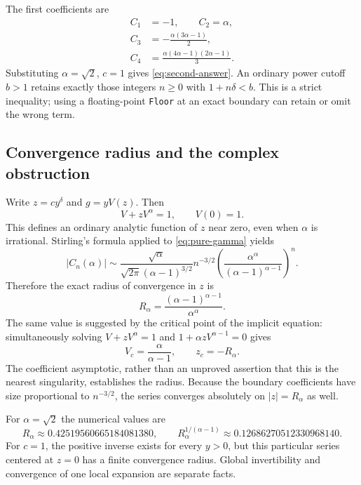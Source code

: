 \documentclass[11pt,a4paper]{article}
\numberwithin{equation}{section}
\theoremstyle{definition}\newtheorem{definition}[theorem]{Definition}
\theoremstyle{remark}\newtheorem{remark}[theorem]{Remark}
\newcommand{\code}[1]{\texttt{#1}}
\begin{document}
The first coefficients are
\begin{align*}
 C_1&=-1,\qquad C_2=\alpha,\\
 C_3&=-\frac{\alpha(3\alpha-1)}2,\\
 C_4&=\frac{\alpha(4\alpha-1)(2\alpha-1)}3.
\end{align*}
Substituting $\alpha=\sqrt2$, $c=1$ gives \cref{eq:second-answer}. An
ordinary power cutoff $b>1$ retains exactly those integers $n\ge0$ with
$1+n\delta<b$. This is a strict inequality; using a floating-point
\code{Floor} at an exact boundary can retain or omit the wrong term.

\subsection{Convergence radius and the complex obstruction}

Write $z=c y^\delta$ and $g=yV(z)$. Then
\begin{equation}
 V+zV^\alpha=1,\qquad V(0)=1.
 \label{eq:pure-implicit}
\end{equation}
This defines an ordinary analytic function of $z$ near zero, even when
$\alpha$ is irrational. Stirling's formula applied to
\cref{eq:pure-gamma} yields
\begin{equation}
 |C_n(\alpha)|\sim
 \frac{\sqrt\alpha}{\sqrt{2\pi}(\alpha-1)^{3/2}}
 n^{-3/2}
 \left(\frac{\alpha^\alpha}{(\alpha-1)^{\alpha-1}}\right)^n.
 \label{eq:coefficient-asymptotic}
\end{equation}
Therefore the exact radius of convergence in $z$ is
\begin{equation}
 R_\alpha=\frac{(\alpha-1)^{\alpha-1}}{\alpha^\alpha}.
 \label{eq:pure-radius}
\end{equation}
The same value is suggested by the critical point of the implicit
equation: simultaneously solving $V+zV^\alpha=1$ and
$1+\alpha zV^{\alpha-1}=0$ gives
\[
 V_c=\frac\alpha{\alpha-1},\qquad z_c=-R_\alpha.
\]
The coefficient asymptotic, rather than an unproved assertion that this
is the nearest singularity, establishes the radius. Because the boundary
coefficients have size proportional to $n^{-3/2}$, the series converges
absolutely on $|z|=R_\alpha$ as well.

For $\alpha=\sqrt2$ the numerical values are
\begin{equation}
 R_\alpha\approx0.42519560665184081380,\qquad
 R_\alpha^{1/(\alpha-1)}\approx0.12686270512330968140.
 \label{eq:numeric-radius}
\end{equation}
For $c=1$, the positive inverse exists for every $y>0$, but this particular
series centered at $z=0$ has a finite convergence radius. Global
invertibility and convergence of one local expansion are separate facts.
\end{document}
